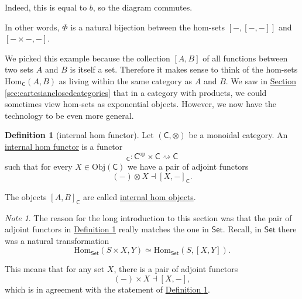 \documentclass[a4paper]{report}
\newcommand{\defn}[1]{\ul{#1}}
\newcommand{\Obj}{\mathrm{Obj}}
\newcommand{\Hom}{\mathrm{Hom}}
\theoremstyle{definition}
\newtheorem{definition}{Definition}[section]
\theoremstyle{plain}
\theoremstyle{remark}
\newtheorem{note}{Note}[section]
\begin{document}
Indeed, this is equal to $b$, so the diagram commutes.

In other words, $\Phi$ is a natural bijection between the hom-sets $[-,[-,-]]$ and $[- \times -, -]$.

We picked this example because the collection $[A, B]$ of all functions between two sets $A$ and $B$ is itself a set. Therefore it makes sense to think of the hom-sets $\Hom_{\mathsf{C}}(A, B)$ as living within the same category as $A$ and $B$. We saw in \hyperref[sec:cartesianclosedcategories]{Section \ref*{sec:cartesianclosedcategories}} that in a category with products, we could sometimes view hom-sets as exponential objects. However, we now have the technology to be even more general.

\begin{definition}[internal hom functor]
  \label{def:internalhomfunctor}
  Let $(\mathsf{C}, \otimes)$ be a monoidal category. An \defn{internal hom functor} is a functor
  \begin{equation*}
    [-, -]_{\mathsf{C}}\colon \mathsf{C}^{\mathrm{op}} \times \mathsf{C} \rightsquigarrow \mathsf{C}
  \end{equation*}
  such that for every $X \in \Obj(\mathsf{C})$ we have a pair of adjoint functors
  \begin{equation*}
    (-) \otimes X \dashv [X, -]_{\mathsf{C}}.
  \end{equation*}

  The objects $[A, B]_{\mathsf{C}}$ are called \defn{internal hom objects}.
\end{definition}

\begin{note}
  The reason for the long introduction to this section was that the pair of adjoint functors in \hyperref[def:internalhomfunctor]{Definition \ref*{def:internalhomfunctor}} really matches the one in $\mathsf{Set}$. Recall, in $\mathsf{Set}$ there was a natural transformation
  \begin{equation*}
    \Hom_{\mathsf{Set}}(S \times X, Y) \simeq \Hom_{\mathsf{Set}}(S, [X, Y]).
  \end{equation*}

  This means that for any set $X$, there is a pair of adjoint functors 
  \begin{equation*}
    (-) \times X \dashv [X, -],
  \end{equation*}
  which is in agreement with the statement of \hyperref[def:internalhomfunctor]{Definition \ref*{def:internalhomfunctor}}.
\end{note}
\end{document}
